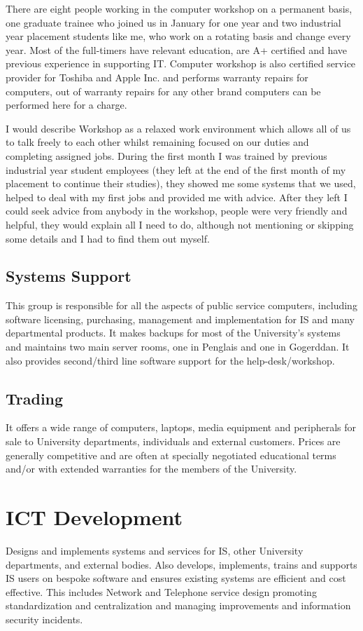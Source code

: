 \documentclass[10pt,a4paper,headinclude=true]{report}
\begin{document}
There are eight people working in the computer workshop on a permanent basis, one graduate trainee who joined us in January for one year and two industrial year placement students like me, who work on a rotating basis and change every year. Most of the full-timers have relevant education, are A+ certified\cite{A+} and have previous experience in supporting IT. Computer workshop is also certified service provider for Toshiba and Apple Inc. and performs warranty repairs for computers, out of warranty repairs for any other brand computers can be performed here for a charge. 

I would describe Workshop as a relaxed work environment which allows all of us to talk freely to each other whilst remaining focused on our duties and completing assigned jobs. During the first month I was trained by previous industrial year student employees (they left at the end of the first month of my placement to continue their studies), they showed me some systems that we used, helped to deal with my first jobs and provided me with advice. After they left I could seek advice from anybody in the workshop, people were very friendly and helpful, they would explain all I need to do, although not mentioning or skipping some details and I had to find them out myself.
\subsection{Systems Support}
This group is responsible for all the aspects of public service computers, including software licensing, purchasing, management and implementation for IS and many departmental products. It makes backups for most of the University's systems and maintains two main server rooms, one in Penglais and one in Gogerddan. It also provides second/third line software support for the help-desk/workshop.\cite{InternalTeamdescription}
\subsection{Trading}
It offers a wide range of computers, laptops, media equipment and peripherals for sale to University departments, individuals and external customers. Prices are generally competitive and are often at specially negotiated educational terms and/or with extended warranties for the members of the University.\cite{InternalTeamdescription}
\section{ICT Development}
Designs and implements systems and services for IS, other University departments, and external bodies. Also develops, implements, trains and supports IS users on bespoke software and ensures existing systems are efficient and cost effective. This includes Network and Telephone service design promoting standardization and centralization and managing improvements and information security incidents.\cite{InternalTeamdescription}
\end{document}
